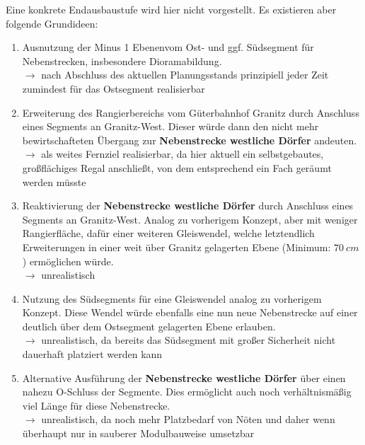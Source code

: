 Eine konkrete Endausbaustufe wird hier nicht vorgestellt.
Es existieren aber folgende Grundideen:
\begin{enumerate}
	\item Ausnutzung der Minus 1 Ebenenvom Ost- und ggf. S\"udsegment f\"ur Nebenstrecken, insbesondere Dioramabildung.\\
	$\rightarrow$ nach Abschluss des aktuellen Planungsstands prinzipiell jeder Zeit zumindest f\"ur das Ostsegment realisierbar
	\item Erweiterung des Rangierbereichs vom G\"uterbahnhof Granitz durch Anschluss eines Segments an Granitz-West.
	Dieser w\"urde dann den nicht mehr bewirtschafteten \"Ubergang zur \textbf{Nebenstrecke westliche D\"orfer} andeuten.\\
	$\rightarrow$ als weites Fernziel realisierbar, da hier aktuell ein selbstgebautes, gro{\ss}fl\"achiges Regal anschlie{\ss}t, von dem entsprechend ein Fach ger\"aumt werden m\"usste
	\item Reaktivierung der \textbf{Nebenstrecke westliche D\"orfer} durch Anschluss eines Segments an Granitz-West.
	Analog zu vorherigem Konzept, aber mit weniger Rangierfl\"ache, daf\"ur einer weiteren Gleiswendel, welche letztendlich Erweiterungen in einer weit \"uber Granitz gelagerten Ebene (Minimum: $70~cm$) erm\"oglichen w\"urde.\\
	$\rightarrow$ unrealistisch
	\item Nutzung des S\"udsegments f\"ur eine Gleiswendel analog zu vorherigem Konzept.
	Diese Wendel w\"urde ebenfalls eine nun neue Nebenstrecke auf einer deutlich \"uber dem Ostsegment gelagerten Ebene erlauben.\\
	$\rightarrow$ unrealistisch, da bereits das S\"udsegment mit gro{\ss}er Sicherheit nicht dauerhaft platziert werden kann
	\item Alternative Ausf\"uhrung der \textbf{Nebenstrecke westliche D\"orfer} \"uber einen nahezu O-Schluss der Segmente.
	Dies erm\"oglicht auch noch verh\"altnism\"a{\ss}ig viel L\"ange f\"ur diese Nebenstrecke.\\
	$\rightarrow$ unrealistisch, da noch mehr Platzbedarf von N\"oten und daher wenn \"uberhaupt nur in sauberer Modulbauweise umsetzbar
\end{enumerate}

